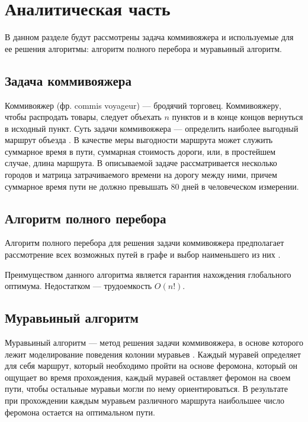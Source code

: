 \chapter{Аналитическая часть}
В данном разделе будут рассмотрены задача коммивояжера и используемые для ее решения алгоритмы: алгоритм полного перебора и муравьиный алгоритм. 

\section{Задача коммивояжера}

Коммивояжер (фр. commis voyageur) --- бродячий торговец.  Коммивояжеру, чтобы распродать товары, следует объехать $n$ пунктов и в конце концов вернуться в исходный пункт. Суть задачи коммивояжера --- определить наиболее выгодный маршрут объезда \cite{kom-task}. В качестве меры выгодности маршрута может служить суммарное время в пути, суммарная стоимость дороги, или, в простейшем случае, длина
маршрута.
В описываемой задаче рассматривается несколько городов и матрица затрачиваемого времени на дорогу между ними, причем суммарное время пути не должно превышать 80 дней в человеческом измерении.

\section{Алгоритм полного перебора}

Алгоритм полного перебора для решения задачи коммивояжера предполагает рассмотрение всех возможных путей в графе и выбор наименьшего из них \cite{kom-task-all}.

Преимуществом данного алгоритма является гарантия нахождения глобального оптимума. Недостатком --- трудоемкость $O(n!)$. 

\section{Муравьиный алгоритм}

Муравьиный алгоритм  --- метод решения задачи коммивояжера, в основе которого лежит моделирование поведения колонии муравьев \cite{ant-alg}.
Каждый муравей определяет для себя маршрут, который необходимо пройти на основе феромона, который он ощущает во время прохождения, каждый муравей оставляет феромон на своем пути, чтобы остальные муравьи могли по нему ориентироваться. В результате при прохождении каждым муравьем различного маршрута наибольшее число феромона остается на оптимальном пути.


